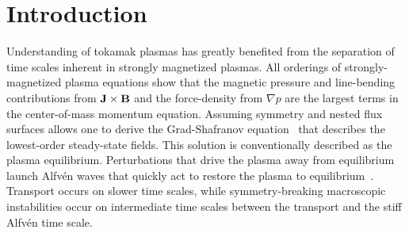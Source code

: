 \documentclass[english,aps,superscriptaddress,showkeys,showpacs,prepri,twocolumn]{revtex4}
\begin{document}
  \newcommand{\R}{ \psi }
  \newcommand{\T}{ \Theta }
  \newcommand{\Z}{ \zeta }
  \newcommand{\A}{ \alpha }
  \newcommand{\U}{ u }
  \newcommand{\ve}{ \vect{e} }
  \newcommand{\vur}{ \vect{e}^\rho }
  \newcommand{\vut}{ \vect{e}^\Theta }
  \newcommand{\vuz}{ \vect{e}^\zeta }
  \newcommand{\vlr}{ \vect{e}_\rho }
  \newcommand{\vlt}{ \vect{e}_\Theta }
  \newcommand{\vlz}{ \vect{e}_\zeta }
  \newcommand{\gr}{ \grad \R }
  \newcommand{\gt}{ \grad \Theta }
  \newcommand{\gz}{ \grad \zeta }
  \newcommand{\ga}{ \grad \alpha }
  \newcommand{\gu}{ \grad \U }
  \newcommand{\dr}[1]{ \frac{\partial #1}{\partial \R} }
  \newcommand{\dT}[1]{\frac{\partial #1}{\partial \Theta}}
  \newcommand{\dz}[1]{\frac{\partial #1}{\partial \zeta}}
  \newcommand{\dU}[1]{\frac{\partial #1}{\partial \U}}
  \newcommand{\drs}[1]{ \frac{\partial^2 #1}{\partial \R^2} }
  \newcommand{\dTs}[1]{\frac{\partial^2 #1}{\partial \Theta^2}}
  \newcommand{\drt}[1]{\frac{\partial^2 #1}{\partial \R \partial \Theta}}
  \newcommand{\dzs}[1]{\frac{\partial^2 #1}{\partial \zeta^2}}
  \newcommand{\grr}{ g^{\R \R} }
  \newcommand{\grt}{ g^{\R \Theta} }
  \newcommand{\grz}{ g^{\R \zeta} }
  \newcommand{\gtz}{ g^{\Theta \zeta} }
  \newcommand{\gtt}{ g^{\Theta \Theta} }
  \newcommand{\gzz}{ g^{\zeta \zeta} } 
  \newcommand{\ri}{ \frac{1}{R^2} }
  \newcommand{\fr}{ \lp \R \rp}
  \newcommand{\frt}{ \lp \R, \T \rp}
  \newcommand{\frtz}{ \lp \R,\T,\Z \rp}

  \newcommand{\fluxav}[1]{\la #1 \ra}
  \newcommand{\thetaav}[1]{\la #1 \ra_\T}


\newcommand{\cramplist}{
        \setlength{\itemsep}{0in}
        \setlength{\partopsep}{0in}
        \setlength{\topsep}{0in}}
\newcommand{\cramp}{\setlength{\parskip}{.5\parskip}}
\newcommand{\zapspace}{\topsep=0pt\partopsep=0pt\itemsep=0pt\parskip=0pt}

\section{Introduction}
\label{sec:introduction}

Understanding of tokamak plasmas has greatly benefited from the
separation of time scales inherent in strongly magnetized plasmas.  
All orderings of strongly-magnetized plasma equations show that the magnetic
pressure and line-bending contributions from $\mathbf{J} \times \mathbf{B}$ and the
force-density from $\nabla p$ are the largest terms in the center-of-mass
momentum equation.
Assuming symmetry and nested flux surfaces allows one to derive the
Grad-Shafranov equation~\cite{shafranov71} that describes the lowest-order
steady-state fields. This solution is conventionally described as the plasma
equilibrium.  Perturbations that drive the plasma away from equilibrium launch
Alfv\'en waves that quickly act to restore the plasma to
equilibrium~\cite{Jenkins:2010bz}.  Transport occurs on slower time scales,
while symmetry-breaking macroscopic instabilities occur on intermediate time
scales between the transport and the stiff Alfv\'en time scale.
\end{document}
